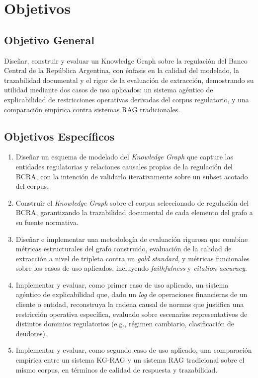 \documentclass[12pt,a4paper]{article}
\begin{document}
\section{Objetivos}

\subsection{Objetivo General}
Diseñar, construir y evaluar un Knowledge Graph sobre la regulación del Banco Central de la República Argentina, con énfasis en la calidad del modelado, la trazabilidad documental y el rigor de la evaluación de extracción, demostrando su utilidad mediante dos casos de uso aplicados: un sistema agéntico de explicabilidad de restricciones operativas derivadas del corpus regulatorio, y una comparación empírica contra sistemas RAG tradicionales.

\subsection{Objetivos Específicos}

\begin{enumerate}
    \item Diseñar un esquema de modelado del \textit{Knowledge Graph} que capture las entidades regulatorias y relaciones causales propias de la regulación del BCRA, con la intención de validarlo iterativamente sobre un subset acotado del corpus.

    \item Construir el \textit{Knowledge Graph} sobre el corpus seleccionado de regulación del BCRA, garantizando la trazabilidad documental de cada elemento del grafo a su fuente normativa.

    \item Diseñar e implementar una metodología de evaluación rigurosa que combine métricas estructurales del grafo construido, evaluación de la calidad de extracción a nivel de tripleta contra un \textit{gold standard}, y métricas funcionales sobre los casos de uso aplicados, incluyendo \textit{faithfulness} y \textit{citation accuracy}.

    \item Implementar y evaluar, como primer caso de uso aplicado, un sistema agéntico de explicabilidad que, dado un \textit{log} de operaciones financieras de un cliente o entidad, reconstruya la cadena causal de normas que justifica una restricción operativa específica, evaluado sobre escenarios representativos de distintos dominios regulatorios (e.g., régimen cambiario, clasificación de deudores).
    
    \item Implementar y evaluar, como segundo caso de uso aplicado, una comparación empírica entre un sistema KG-RAG y un sistema RAG tradicional sobre el mismo corpus, en términos de calidad de respuesta y trazabilidad.
    
\end{enumerate}
\end{document}
